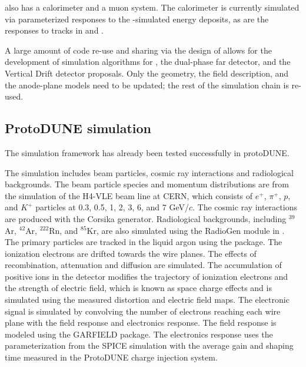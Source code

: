 \documentclass[../main-v1.tex]{subfiles}
\begin{document}
 also has a calorimeter and a muon system.  The calorimeter is currently simulated via parameterized responses to the -simulated energy deposits, as are the responses to tracks in  and .

A large amount of code re-use and sharing via the design of  allows for the development of simulation algorithms for , the dual-phase far detector, and the Vertical Drift detector proposals.  Only the geometry, the field description, and the anode-plane models need to be updated; the rest of the simulation chain is re-used.


\subsection{ProtoDUNE simulation }

The simulation framework has already been tested successfully in protoDUNE. 

The  simulation includes beam particles, cosmic ray interactions and radiological backgrounds. The beam particle species and momentum distributions are from the  simulation of the H4-VLE beam line at CERN, which consists of $e^{+}$, $\pi^{+}$, $p$, and $K^{+}$ particles at 0.3, 0.5, 1, 2, 3, 6, and 7 GeV/$c$. The cosmic ray interactions are produced with the Corsika generator. Radiological backgrounds, including $^{39}$Ar, $^{42}$Ar, $^{222}$Rn, and $^{85}$Kr, are also simulated using the RadioGen module in . The primary particles are tracked in the liquid argon using the  package. The ionization electrons are drifted towards the wire planes. The effects of recombination, attenuation and diffusion are simulated. The accumulation of positive ions in the detector modifies the trajectory of ionization electrons and the strength of electric field, which is known as space charge effects and is simulated using the measured distortion and electric field maps. The electronic signal is simulated by convolving the number of electrons reaching each wire plane with the field response and electronics response. The field response is modeled using the GARFIELD package. The electronics response uses the parameterization from the SPICE simulation with the average gain and shaping time measured in the ProtoDUNE charge injection system. %
\end{document}
